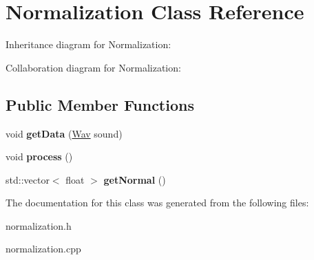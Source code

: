 \hypertarget{classNormalization}{}\section{Normalization Class Reference}
\label{classNormalization}


Inheritance diagram for Normalization\+:


Collaboration diagram for Normalization\+:
\subsection*{Public Member Functions}
\begin{DoxyCompactItemize}
\item 
\mbox{\label{classNormalization_a59c6ac0b235429f48212236fdc6f6f44}} 
void {\bfseries get\+Data} (\hyperlink{classWav}{Wav} sound)
\item 
\mbox{\label{classNormalization_a7666aa086ded5e86b4b5c330e49bab26}} 
void {\bfseries process} ()
\item 
\mbox{\label{classNormalization_a17e9a95b24923be2524fd790dae5b752}} 
std\+::vector$<$ float $>$ {\bfseries get\+Normal} ()
\end{DoxyCompactItemize}


The documentation for this class was generated from the following files\+:\begin{DoxyCompactItemize}
\item 
normalization.\+h\item 
normalization.\+cpp\end{DoxyCompactItemize}
